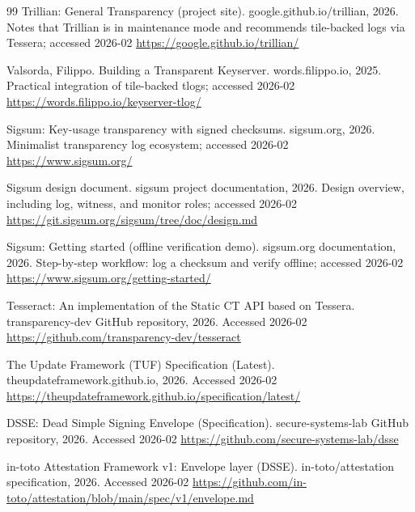 \documentclass[11pt]{article}
\begin{document}
\begin{thebibliography}{99}
\newblock Trillian: General Transparency (project site).
\newblock google.github.io/trillian, 2026.
\newblock Notes that Trillian is in maintenance mode and recommends tile-backed logs via Tessera; accessed 2026-02
\newblock \url{https://google.github.io/trillian/}

Valsorda, Filippo.
\newblock Building a Transparent Keyserver.
\newblock words.filippo.io, 2025.
\newblock Practical integration of tile-backed tlogs; accessed 2026-02
\newblock \url{https://words.filippo.io/keyserver-tlog/}

\newblock Sigsum: Key-usage transparency with signed checksums.
\newblock sigsum.org, 2026.
\newblock Minimalist transparency log ecosystem; accessed 2026-02
\newblock \url{https://www.sigsum.org/}

\newblock Sigsum design document.
\newblock sigsum project documentation, 2026.
\newblock Design overview, including log, witness, and monitor roles; accessed 2026-02
\newblock \url{https://git.sigsum.org/sigsum/tree/doc/design.md}

\newblock Sigsum: Getting started (offline verification demo).
\newblock sigsum.org documentation, 2026.
\newblock Step-by-step workflow: log a checksum and verify offline; accessed 2026-02
\newblock \url{https://www.sigsum.org/getting-started/}

\newblock Tesseract: An implementation of the Static CT API based on Tessera.
\newblock transparency-dev GitHub repository, 2026.
\newblock Accessed 2026-02
\newblock \url{https://github.com/transparency-dev/tesseract}

\newblock The Update Framework (TUF) Specification (Latest).
\newblock theupdateframework.github.io, 2026.
\newblock Accessed 2026-02
\newblock \url{https://theupdateframework.github.io/specification/latest/}

\newblock DSSE: Dead Simple Signing Envelope (Specification).
\newblock secure-systems-lab GitHub repository, 2026.
\newblock Accessed 2026-02
\newblock \url{https://github.com/secure-systems-lab/dsse}

\newblock in-toto Attestation Framework v1: Envelope layer (DSSE).
\newblock in-toto/attestation specification, 2026.
\newblock Accessed 2026-02
\newblock \url{https://github.com/in-toto/attestation/blob/main/spec/v1/envelope.md}


\end{thebibliography}
\end{document}
